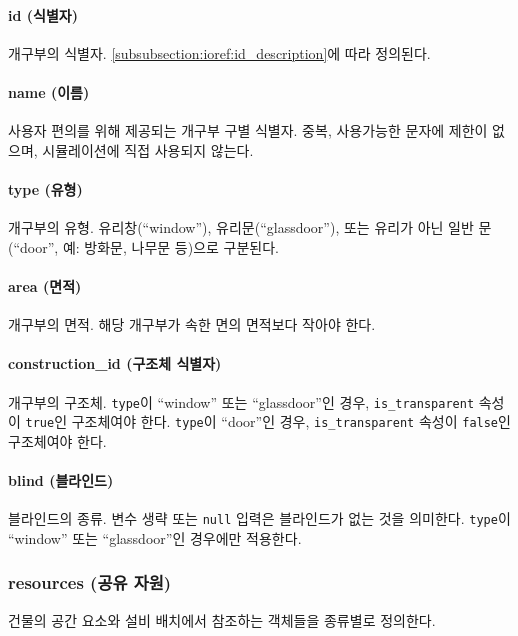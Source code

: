 \paragraph{id (식별자)} 개구부의 식별자. \ref{subsubsection:ioref:id_description}에 따라 정의된다.

\paragraph{name (이름)} 사용자 편의를 위해 제공되는 개구부 구별 식별자. 중복, 사용가능한 문자에 제한이 없으며, 시뮬레이션에 직접 사용되지 않는다.

\paragraph{type (유형)} 개구부의 유형. 유리창(``window''), 유리문(``glassdoor''), 또는 유리가 아닌 일반 문(``door'', 예: 방화문, 나무문 등)으로 구분된다.

\paragraph{area (면적)} 개구부의 면적. 해당 개구부가 속한 면의 면적보다 작아야 한다.

\paragraph{construction\_id (구조체 식별자)} 개구부의 구조체. \texttt{type}이 ``window'' 또는 ``glassdoor''인 경우, \texttt{is\_transparent} 속성이 \texttt{true}인 구조체여야 한다. \texttt{type}이 ``door''인 경우, \texttt{is\_transparent} 속성이 \texttt{false}인 구조체여야 한다.

\paragraph{blind (블라인드)} 블라인드의 종류. 변수 생략 또는 \texttt{null} 입력은 블라인드가 없는 것을 의미한다. \texttt{type}이 ``window'' 또는 ``glassdoor''인 경우에만 적용한다.

\subsubsection{resources (공유 자원)} \label{subsubsection:ioref:resources}
건물의 공간 요소와 설비 배치에서 참조하는 객체들을 종류별로 정의한다.

